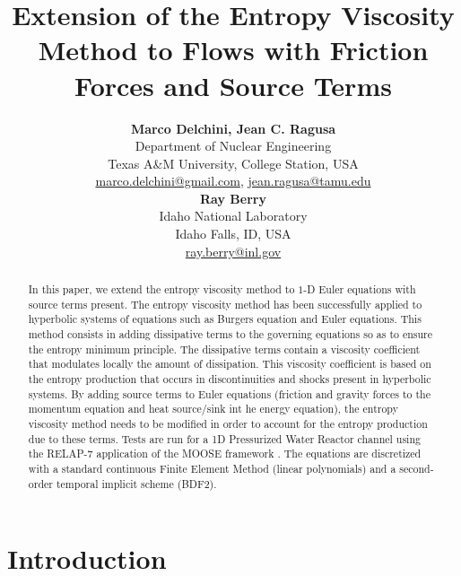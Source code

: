 \documentclass[12pt]{article}
\title{Extension of the Entropy Viscosity Method to Flows with Friction Forces and Source Terms}
\author{ 
  \textbf{Marco Delchini, Jean C. Ragusa} \\
  Department of Nuclear Engineering \\
  Texas A\&M University, College Station, USA\\
  \href{mailto:marco.delchini@gmail.com}{marco.delchini@gmail.com}, 
  \href{mailto:jean.ragusa@tamu.edu}{jean.ragusa@tamu.edu}\\
  \textbf{Ray Berry} \\
  Idaho National Laboratory\\
  Idaho Falls, ID, USA\\
  \href{mailto:ray.berry@inl.gov}{ray.berry@inl.gov}
}
\begin{document}


\maketitle

\begin{abstract}
In this paper, we extend the entropy viscosity method \cite{valentin, jlg1, jlg2} to $1$-D Euler equations with source terms present. 
The entropy viscosity method has been successfully applied to hyperbolic systems of equations such as Burgers equation and Euler
equations. This method consists in adding dissipative terms to the governing equations so as to ensure the entropy minimum principle. The dissipative terms contain a viscosity coefficient that modulates locally the amount of dissipation.
This viscosity coefficient is based on the entropy production that occurs in discontinuities and shocks present in hyperbolic systems.
By adding source terms to Euler equations (friction and gravity forces to the momentum equation and heat source/sink int he energy equation), the entropy viscosity method needs to be modified in order to account for the entropy production due to these terms. Tests are run for a 1D Pressurized Water Reactor channel using the RELAP-7 application of the MOOSE framework \cite{Moose}. The equations are discretized with a standard continuous Finite Element Method (linear polynomials) and a second-order temporal implicit scheme (BDF2). 
\end{abstract}


%
\section{Introduction}
\label{sect::intro}
\end{document}
